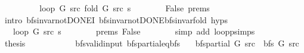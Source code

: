 \begin{isabellebody}
\ \ \ \ \isamarkupfalse%
\ \isamarkupfalse%
\ {\isachardoublequoteopen}{\isachardot}{\kern0pt}{\isachardot}{\kern0pt}{\isachardot}{\kern0pt}\ {\isacharequal}{\kern0pt}\ loop\ G\ src\ {\isacharparenleft}{\kern0pt}fold\ G\ src\ s{\isacharparenright}{\kern0pt}{\isachardoublequoteclose}\isanewline
\ \ \ \ \ \ \isamarkupfalse%
\ False\ {\isachardoublequoteopen}{}{\isachardot}{\kern0pt}prems{\isachardoublequoteclose}\isanewline
\ \ \ \ \ \ \isamarkupfalse%
\ {\isacharparenleft}{\kern0pt}intro\ bfs{\isacharunderscore}{\kern0pt}invar{\isacharunderscore}{\kern0pt}not{\isacharunderscore}{\kern0pt}DONE{\isacharprime}{\kern0pt}I\ bfs{\isacharunderscore}{\kern0pt}invar{\isacharunderscore}{\kern0pt}not{\isacharunderscore}{\kern0pt}DONE{\isachardot}{\kern0pt}bfs{\isacharunderscore}{\kern0pt}invar{\isacharunderscore}{\kern0pt}fold\ {\isachardoublequoteopen}{}{\isachardot}{\kern0pt}hyps{\isachardoublequoteclose}{\isacharparenright}{\kern0pt}\isanewline
\ \ \ \ \isamarkupfalse%
\ \isamarkupfalse%
\ {\isachardoublequoteopen}{\isachardot}{\kern0pt}{\isachardot}{\kern0pt}{\isachardot}{\kern0pt}\ {\isacharequal}{\kern0pt}\ loop\ G\ src\ s{\isachardoublequoteclose}\isanewline
\ \ \ \ \ \ \isamarkupfalse%
\ {\isachardoublequoteopen}{}{\isachardot}{\kern0pt}prems{\isachardoublequoteclose}\ False\isanewline
\ \ \ \ \ \ \isamarkupfalse%
\ {\isacharparenleft}{\kern0pt}simp\ add{\isacharcolon}{\kern0pt}\ loop{\isacharunderscore}{\kern0pt}psimps{\isacharparenright}{\kern0pt}\isanewline
\ \ \ \ \isamarkupfalse%
\ \isamarkupfalse%
\ {\isacharquery}{\kern0pt}thesis\isanewline
\ \ \ \ \ \ \isacommand{{\isachardot}{\kern0pt}}\isamarkupfalse%
\isanewline
\ \ \isamarkupfalse%
\isanewline
{}\isamarkupfalse%
%
\endisatagproof
{\isafoldproof}%
%
\isadelimproof
\isanewline
%
\endisadelimproof
\isanewline
{}\isamarkupfalse%
\ {\isacharparenleft}{\kern0pt}\ bfs{\isacharunderscore}{\kern0pt}valid{\isacharunderscore}{\kern0pt}input{\isacharparenright}{\kern0pt}\ bfs{\isacharunderscore}{\kern0pt}partial{\isacharunderscore}{\kern0pt}eq{\isacharunderscore}{\kern0pt}bfs{\isacharcolon}{\kern0pt}\isanewline
\ \ \ {\isachardoublequoteopen}bfs{\isacharunderscore}{\kern0pt}partial\ G\ src\ {\isacharequal}{\kern0pt}\ bfs\ G\ src{\isachardoublequoteclose}\isanewline
%
\isadelimproof
\ \ %
\endisadelimproof
%
\isatagproof
{}\isamarkupfalse%

\end{isabellebody}
